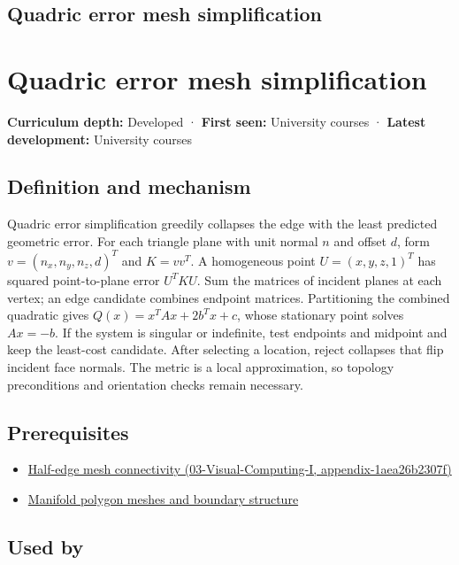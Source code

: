 \hypertarget{appendix-1dd4ad54ca57}{}
\section*{Quadric error mesh simplification}
\chapter{Quadric error mesh simplification}\label{appendix-1dd4ad54ca57-quadric-error-mesh-simplification}

\textbf{Curriculum depth:} Developed · \textbf{First seen:} University courses · \textbf{Latest development:} University courses

\section{Definition and mechanism}\label{appendix-1dd4ad54ca57-definition-and-mechanism}

Quadric error simplification greedily collapses the edge with the least predicted geometric error. For each triangle plane with unit normal \(n\) and offset \(d\), form \(v=(n_x,n_y,n_z,d)^T\) and \(K=vv^T\). A homogeneous point \(U=(x,y,z,1)^T\) has squared point-to-plane error \(U^TKU\). Sum the matrices of incident planes at each vertex; an edge candidate combines endpoint matrices. Partitioning the combined quadratic gives \(Q(x)=x^TAx+2b^Tx+c\), whose stationary point solves \(Ax=-b\). If the system is singular or indefinite, test endpoints and midpoint and keep the least-cost candidate. After selecting a location, reject collapses that flip incident face normals. The metric is a local approximation, so topology preconditions and orientation checks remain necessary.

\section{Prerequisites}\label{appendix-1dd4ad54ca57-prerequisites}

\begin{itemize}
\tightlist
\item
  \href{../03-Visual-Computing-I/main.pdf\#nameddest=appendix-1aea26b2307f}{Half-edge mesh connectivity (03-Visual-Computing-I, appendix-1aea26b2307f)}
\item
  \hyperref[appendix-fab348609369]{Manifold polygon meshes and boundary structure}
\end{itemize}

\section{Used by}\label{appendix-1dd4ad54ca57-used-by}

